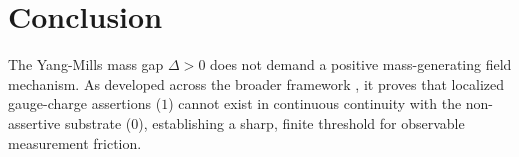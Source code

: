 \documentclass[11pt,a4paper]{article}
\begin{document}
\section{Conclusion}
The Yang-Mills mass gap $\Delta > 0$ does not demand a positive mass-generating field mechanism. As developed across the broader framework \cite{nicht_theory_monograph, nicht_physics_paper_1}, it proves that localized gauge-charge assertions ($1$) cannot exist in continuous continuity with the non-assertive substrate ($0$), establishing a sharp, finite threshold for observable measurement friction.



\end{document}
